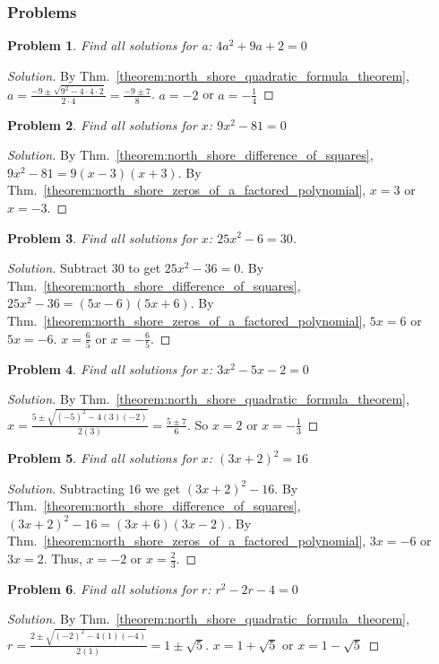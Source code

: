 \documentclass[oneside]{book}
\theoremstyle{mystyle}
\newtheorem{problem}{Problem}[section]
\begin{document}
\subsubsection{Problems}
\begin{problem}
Find all solutions for a: $4a^2 + 9a + 2 = 0$
\end{problem}
\begin{proof}[Solution]
By Thm.~\ref{theorem:north_shore_quadratic_formula_theorem}, $a = \frac{-9 \pm \sqrt{9^2 - 4\cdot 4 \cdot 2}}{2\cdot 4} = \frac{-9 \pm 7}{8}$. $a=-2$ or $a=-\frac{1}{4}$
\end{proof}
\begin{problem}
Find all solutions for $x$: $9x^2 - 81 = 0$
\end{problem}
\begin{proof}[Solution]
By Thm.~\ref{theorem:north_shore_difference_of_squares}, $9x^2-81 = 9(x - 3)(x+3)$. By Thm.~\ref{theorem:north_shore_zeros_of_a_factored_polynomial}, $x = 3$ or $x= -3$.
\end{proof}
\begin{problem}
Find all solutions for $x$: $25x^2 - 6 = 30$.
\end{problem}
\begin{proof}[Solution]
Subtract $30$ to get $25x^2 - 36 = 0$. By Thm.~\ref{theorem:north_shore_difference_of_squares}, $25x^2-36 =(5x - 6)(5x+6)$. By Thm.~\ref{theorem:north_shore_zeros_of_a_factored_polynomial}, $5x = 6$ or $5x = -6$. $x = \frac{6}{5}$ or $x=-\frac{6}{5}$.
\end{proof}
\begin{problem}
Find all solutions for $x$: $3x^2 - 5x - 2 = 0$
\end{problem}
\begin{proof}[Solution]
By Thm.~\ref{theorem:north_shore_quadratic_formula_theorem}, $x = \frac{5 \pm \sqrt{(-5)^2 - 4(3)(-2)}}{2(3)} = \frac{5 \pm 7}{6}$. So $x = 2$ or $x = -\frac{1}{3}$
\end{proof}
\begin{problem}
Find all solutions for $x$: $(3x+2)^2 = 16$
\end{problem}
\begin{proof}[Solution]
Subtracting $16$ we get $(3x+2)^2 - 16$. By Thm.~\ref{theorem:north_shore_difference_of_squares}, $(3x+2)^2-16 = (3x+6)(3x-2)$. By Thm.~\ref{theorem:north_shore_zeros_of_a_factored_polynomial}, $3x = -6$ or $3x = 2$. Thus, $x = -2$ or $x = \frac{2}{3}$.
\end{proof}
\begin{problem}
Find all solutions for $r$: $r^2 - 2r - 4 = 0$
\end{problem}
\begin{proof}[Solution]
By Thm.~\ref{theorem:north_shore_quadratic_formula_theorem}, $r = \frac{2 \pm \sqrt{(-2)^2 - 4(1)(-4)}}{2(1)} =  1\pm \sqrt{5}$. $x = 1+\sqrt{5}$ or $x=1-\sqrt{5}$
\end{proof}
\end{document}
